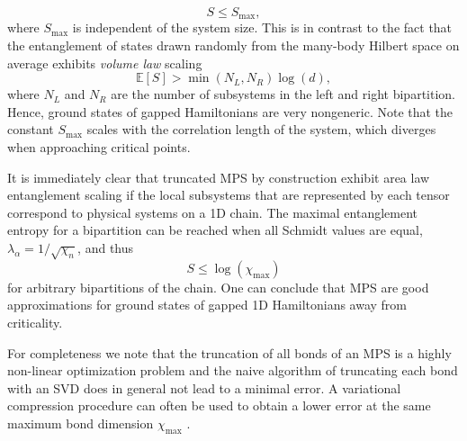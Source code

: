 \begin{equation}
	S \le S_\text{max}, 
\end{equation}
where $S_\text{max}$ is independent of the system size. This is in contrast to the fact that the entanglement of states drawn randomly from the many-body Hilbert space on average exhibits \textit{volume law} scaling
\begin{equation}
	\mathbb{E}\left[S\right] > \min\left(N_L, N_R\right)\log(d),
\end{equation}
where $N_L$ and $N_R$ are the number of subsystems in the left and right bipartition. Hence, ground states of gapped Hamiltonians are very nongeneric. Note that the constant $S_\text{max}$ scales with the correlation length of the system, which diverges when approaching critical points. \par
It is immediately clear that truncated MPS by construction exhibit area law entanglement scaling if the local subsystems that are represented by each tensor correspond to physical systems on a 1D chain. The maximal entanglement entropy for a bipartition can be reached when all Schmidt values are equal, $\lambda_\alpha = 1/\sqrt{\chi_n}$, and thus
\begin{equation}
	S \le \log\left(\chi_\text{max}\right)
\end{equation}
for arbitrary bipartitions of the chain. One can conclude that MPS are good approximations for ground states of gapped 1D Hamiltonians away from criticality. \par 
For completeness we note that the truncation of all bonds of an MPS is a highly non-linear optimization problem and the naive algorithm of truncating each bond with an SVD does in general not lead to a minimal error. A variational compression procedure can often be used to obtain a lower error at the same maximum bond dimension $\chi_\text{max}$ \cite{cite:DMRG_in_the_age_of_MPS}. \par

